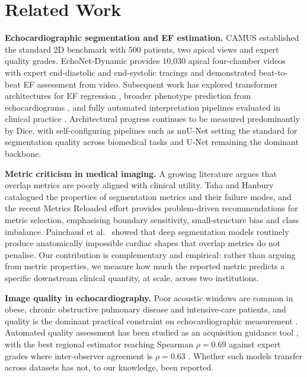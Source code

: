 \documentclass[conference,a4paper]{IEEEtran}
\begin{document}
\section{Related Work}

\textbf{Echocardiographic segmentation and EF estimation.}
CAMUS \cite{leclerc2019} established the standard 2D benchmark with 500 patients, two
apical views and expert quality grades. EchoNet-Dynamic \cite{ouyang2020} provides
10{,}030 apical four-chamber videos with expert end-diastolic and end-systolic tracings and
demonstrated beat-to-beat EF assessment from video. Subsequent work has explored
transformer architectures for EF regression \cite{reynaud2021}, broader phenotype
prediction from echocardiograms \cite{ghorbani2020}, and fully automated interpretation
pipelines evaluated in clinical practice \cite{zhang2018,asch2019}. Architectural progress
continues to be measured predominantly by Dice, with self-configuring pipelines such as
nnU-Net \cite{isensee2021} setting the standard for segmentation quality across
biomedical tasks and U-Net \cite{ronneberger2015} remaining the dominant backbone.

\textbf{Metric criticism in medical imaging.}
A growing literature argues that overlap metrics are poorly aligned with clinical utility.
Taha and Hanbury \cite{taha2015} catalogued the properties of segmentation metrics and
their failure modes, and the recent Metrics Reloaded effort
\cite{maierhein2024,reinke2024} provides problem-driven recommendations for metric
selection, emphasising boundary sensitivity, small-structure bias and class imbalance.
Painchaud et al.\ \cite{painchaud2020} showed that deep segmentation models routinely
produce anatomically impossible cardiac shapes that overlap metrics do not penalise. Our
contribution is complementary and empirical: rather than arguing from metric properties, we
measure how much the reported metric predicts a specific downstream clinical quantity, at
scale, across two institutions.

\textbf{Image quality in echocardiography.}
Poor acoustic windows are common in obese, chronic obstructive pulmonary disease and
intensive-care patients, and quality is the dominant practical constraint on
echocardiographic measurement \cite{lang2015}. Automated quality assessment has been
studied as an acquisition guidance tool \cite{abdi2017}, with the best regional estimator
reaching Spearman $\rho = 0.69$ against expert grades where inter-observer agreement is
$\rho = 0.63$ \cite{rogers2024}. Whether such models transfer across datasets has not, to
our knowledge, been reported.
\end{document}
